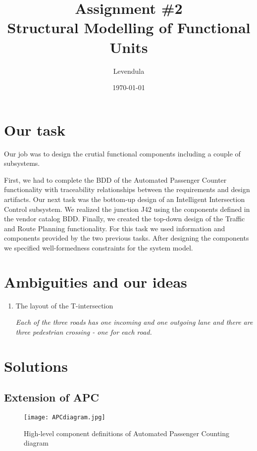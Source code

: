\documentclass[a4paper]{article}
\title{Assignment \#2 \\ Structural Modelling of Functional Units}
\author{Levendula}
\date{\today}
\begin{document}


\tableofcontents
\listoffigures
\clearpage

\section{Our task}

Our job was to design the crutial functional components including a couple of subsystems.

First, we had to complete the BDD of the {Automated Passenger Counter} functionality with traceability relationships between the requirements and design artifacts. Our next task was the bottom-up design of an {Intelligent Intersection Control} subsystem. We realized the junction J42 using the conponents defined in the vendor catalog BDD. Finally, we created the top-down design of the {Traffic and Route Planning} functionality. For this task we used information and components provided by the two previous tasks. After designing the components we specified well-formedness constraints for the system model.
\section{Ambiguities and our ideas}

\begin{enumerate}
	\item The layout of the T-intersection
		
		\textit{Each of the three roads has one incoming and one outgoing lane and there are three pedestrian crossing - one for each road.}
	
\end{enumerate}

\section{Solutions}

\subsection{Extension of APC}

\begin{sidewaysfigure}
	\centering
	\texttt{[image: APCdiagram.jpg]}
	\caption{High-level component definitions of Automated Passenger Counting diagram}%
	\label{fig:APCdiagram}
\end{sidewaysfigure}
\end{document}
